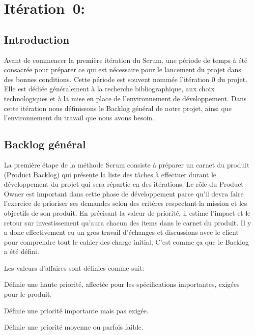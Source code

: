 \section[Itération~0:~(~2/20/2017~-~2/22/2017~)]{Itération~0:~\textup{}}

\subsection*{Introduction}

Avant de commencer la première itération du Scrum, une période de temps à été
consacrée pour préparer ce qui est nécessaire pour le lancement du projet dans
des bonnes conditions. Cette période est souvent nommée l'itération 0 du
projet. Elle est dédiée généralement à la recherche bibliographique, aux choix
technologiques et à la mise en place de l'environnement de développement. Dans
cette itération nous définissons le Backlog général de notre projet, ainsi que
l'environnement du travail que nous avons besoin.

\subsection{Backlog général}

La première étape de la méthode Scrum consiste à préparer un carnet du produit
(Product Backlog) qui présente la liste des tâches à effectuer durant le
développement du projet qui sera répartie en des itérations. Le rôle du Product
Owner est important dans cette phase de développement parce qu'il devra faire
l'exercice de prioriser ses demandes selon des critères respectant la mission
et les objectifs de son produit. En précisant la valeur de priorité, il estime
l'impact et le retour sur investissement qu'aura chacun des items dans le
carnet du produit. Il y a donc effectivement eu un gros travail d'échanges et
discussions avec le client pour comprendre tout le cahier des charge initial,
C'est comme ça que le Backlog a été défini.

Les valeurs d'affaires sont définies comme suit:

\begin{description}[align=right,labelwidth=1cm]
    \item [1:] Définie une haute priorité, affectée pour les spécifications
        importantes, exigées pour le produit.
    \item [2:] Définie une priorité importante mais pas exigée.
    \item [3:] Définie une priorité moyenne ou parfois faible.
\end{description}

